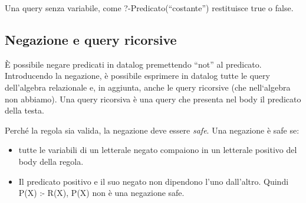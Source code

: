 \documentclass[\main/main.tex]{subfiles}
\begin{document}
Una query senza variabile, come ?-Predicato(``costante'') restituisce true o false.

\subsection{Negazione e query ricorsive}
È possibile negare predicati in datalog premettendo ``not'' al predicato.
Introducendo la negazione, è possibile esprimere in datalog tutte le query dell'algebra relazionale e, in aggiunta, anche le query ricorsive (che nell`algebra non abbiamo).
Una query ricorsiva è una query che presenta nel body il predicato della testa.

Perché la regola sia valida, la negazione deve essere \textit{safe}.
Una negazione è safe se:
\begin{itemize}
  \item tutte le variabili di un letterale negato compaiono in un letterale positivo del body della regola.
  \item Il predicato positivo e il suo negato non dipendono l'uno dall'altro. Quindi P(X) :- R(X), \neg P(X) non è una negazione safe.
\end{itemize}
\end{document}
